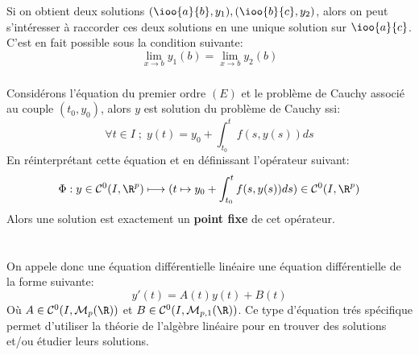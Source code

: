 \subsection*{}
Si on obtient deux solutions \( ( \ioo{a}{b}, y_1), (\ioo{b}{c}, y_2) \), alors on peut s'intéresser à raccorder ces deux solutions en une unique solution sur \( \ioo{a}{c} \). C'est en fait possible sous la condition suivante:
\[ 
   \lim_{x \rightarrow b} y_1(b) = \lim_{x \rightarrow b} y_2(b)
\]
\subsection*{}
Considérons l'équation du premier ordre \((E)\) et le problème de Cauchy associé au couple \( (t_0, y_0) \), alors \( y \) est solution du problème de Cauchy ssi:
\[ 
   \forall t \in I \; ; \; y(t) = y_0 + \int_{t_0}^t f(s, y(s))ds 
\]
En réinterprétant cette équation et en définissant l'opérateur suivant:
\[ 
   \Phi : y \in \mathcal{C}^0(I, \R^p) \longmapsto (t \mapsto y_0 + \int_{t_0}^t f(s, y(s))ds) \in \mathcal{C}^0(I, \R^p)
\]
Alors une solution est exactement un \textbf{point fixe} de cet opérateur.

\chapter*{}
On appele donc une équation différentielle linéaire une équation différentielle de la forme suivante:
\[ 
   y'(t) = A(t)y(t) + B(t) 
\]
Où \(A \in \mathcal{C}^0(I, \mathcal{M}_p( \R))\) et \(B \in \mathcal{C}^0(I, \mathcal{M}_{p, 1}( \R))\). Ce type d'équation trés spécifique permet d'utiliser la théorie de l'algèbre linéaire pour en trouver des solutions et/ou étudier leurs solutions.
\subsection*{}
\subsection*{}
\subsection*{}
\subsection*{}


\chapter*{}

\chapter*{}
